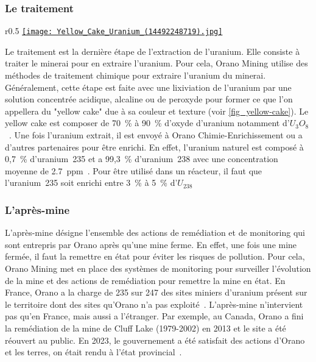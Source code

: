\subsubsection{Le traitement}
\begin{wrapfigure}{r}{0.5\textwidth}
    \centering
    \href{https://commons.wikimedia.org/wiki/File:Yellow_Cake_Uranium_(14492248719).jpg}{\texttt{[image: Yellow\_Cake\_Uranium\_(14492248719).jpg]}}
    \caption[Apparence du yellow cake]{Apparence de yellow cake. Avec des méthodes modernes, certains traitements peuvent lui donner une apparence marron, voir noir. Source~: \href{https://commons.wikimedia.org/wiki/File:Yellow_Cake_Uranium_(14492248719).jpg}{Nuclear Regulatory Commission from US}, Public domain, via Wikimedia Commons}
    \label{fig_yellow-cake}
\end{wrapfigure}

Le traitement est la dernière étape de l'extraction de l'uranium. Elle consiste à traiter le minerai pour en extraire l'uranium. Pour cela, Orano Mining utilise des méthodes de traitement chimique pour extraire l'uranium du minerai. Généralement, cette étape est faite avec une lixiviation de l'uranium par une solution concentrée acidique, alcaline ou de peroxyde pour former ce que l'on appellera du "yellow cake" due à sa couleur et texture (voir \cref{fig_yellow-cake}). Le yellow cake est composer de 70~\% à 90~\% d'oxyde d'uranium notamment d'$U_3O_8$~\cite{article:composition-yellow-cake}. Une fois l'uranium extrait, il est envoyé à Orano Chimie-Enrichissement ou a d'autres partenaires pour être enrichi. En effet, l'uranium naturel est composé à 0,7~\% d'uranium~235 et a 99,3~\% d'uranium~238 avec une concentration moyenne de 2.7~ppm~\cite{site:natural_uranium}. Pour être utilisé dans un réacteur, il faut que l'uranium~235 soit enrichi entre 3~\% à 5~\% d'$U_{238}$~\cite{article:uranium-concentration}



\subsubsection{L'après-mine}
L'après-mine désigne l'ensemble des actions de remédiation et de monitoring qui sont entrepris par Orano après qu'une mine ferme. En effet, une fois une mine fermée, il faut la remettre en état pour éviter les risques de pollution. Pour cela, Orano Mining met en place des systèmes de monitoring pour surveiller l'évolution de la mine et des actions de remédiation pour remettre la mine en état. En France, Orano a la charge de 235 sur 247 des sites miniers d'uranium présent sur le territoire dont des sites qu'Orano n'a pas exploité~\cite{site:orano_apres_mine}. L'après-mine n'intervient pas qu'en France, mais aussi a l'étranger. Par exemple, au Canada, Orano a fini la remédiation de la mine de Cluff Lake (1979-2002) en 2013 et le site a été réouvert au public. En 2023, le gouvernement a été satisfait des actions d'Orano et les terres, on était rendu à l'état provincial~\cite{site:Cluff_lake_remediation}.

